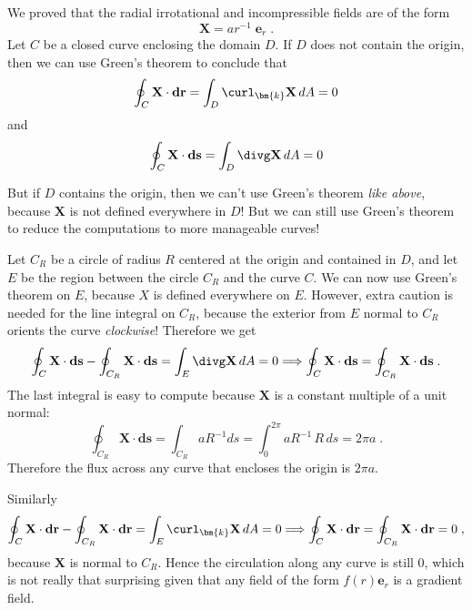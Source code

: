 \begin{frame}
  \frametitle{}

  We proved that the radial irrotational and incompressible fields are of the form
%
$$\textbf{X} = ar^{-1} \; \textbf{e}_r\; .$$
%
Let $C$ be a closed curve enclosing the domain $D$. If $D$ does not contain the origin, then we can use Green's theorem to conclude that
%
$$\oint_C \textbf{X} \cdot \textbf{dr} = \int_D \curl_{\bm{k}} \textbf{X} \, dA = 0$$
%
and
%
$$\oint_C \textbf{X} \cdot \textbf{ds} = \int_D \divg \textbf{X} \, dA = 0$$

But if $D$ contains the origin, then we can't use Green's theorem \emph{like above}, because $\textbf{X}$ is not defined everywhere in $D$! But we can still use Green's theorem to reduce the computations to more manageable curves!

Let $C_R$ be a circle of radius $R$ centered at the origin and contained in $D$, and let $E$ be the region between the circle $C_R$ and the curve $C$. We can now use Green's theorem on $E$, because $X$ is defined everywhere on $E$. However, extra caution is needed for the line integral on $C_R$, because the exterior from $E$ normal to $C_R$ orients the curve \emph{clockwise}! Therefore we get
%
$$\oint_C \textbf{X} \cdot \textbf{ds} - \oint_{C_R} \textbf{X} \cdot \textbf{ds} = \int_E \divg \textbf{X} \, dA = 0 \Longrightarrow \oint_C \textbf{X} \cdot \textbf{ds} = \oint_{C_R} \textbf{X} \cdot \textbf{ds}\;.$$
%
The last integral is easy to compute because $\textbf{X}$ is a constant multiple of a unit normal:
%
$$\oint_{C_R} \textbf{X} \cdot \textbf{ds} = \int_{C_R} aR^{-1} ds = \int_{0}^{2\pi} aR^{-1} \, R \, ds = 2\pi a \; .$$
%
Therefore the flux across any curve that encloses the origin is $2\pi a$.

Similarly
%
%
$$\oint_C \textbf{X} \cdot \textbf{dr} - \oint_{C_R} \textbf{X} \cdot \textbf{dr} = \int_E \curl_{\bm{k}} \textbf{X} \, dA = 0 \Longrightarrow \oint_C \textbf{X} \cdot \textbf{dr} = \oint_{C_R} \textbf{X} \cdot \textbf{dr} = 0\;,$$
%
because $\textbf{X}$ is normal to $C_R$. Hence the circulation along any curve is still 0, which is not really that surprising given that any field of the form $f(r)\textbf{e}_r$ is a gradient field.
\end{frame}












